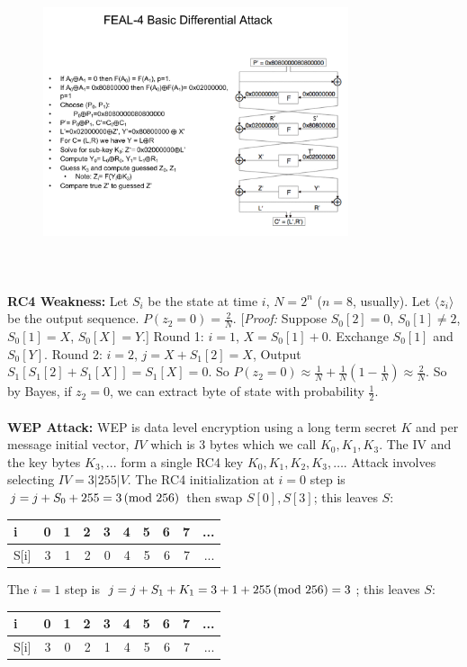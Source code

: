 \begin{figure} 
\center
\includegraphics[width=0.8\textwidth,natwidth=642,natheight=610, height=80mm, width=88mm]{feal2.pdf}
\end{figure}
\\
{\bf RC4 Weakness:}  Let $S_i$ be the state at time $i$, $N= 2^n$ ($n=8$,
usually).
Let $\langle z_i \rangle$ be the output sequence.  $P(z_2=0)= {\frac 2 N}$.
[\emph{Proof:} Suppose $S_0[2]=0$, $S_0[1] \ne 2$, $S_0[1]= X$, $S_0[X]= Y$.]
Round 1:
$i=1$, $X=S_0[1]+0$.  Exchange $S_0[1]$ and $S_0[Y]$.  Round 2: $i=2$,
$j= X+S_1[2]=X$,  Output $S_1[S_1[2]+S_1[X]]= S_1[X]= 0$.  So
$P(z_2 = 0) \approx {\frac 1 N} + {\frac 1 N} (1- {\frac 1 N}) \approx
{\frac 2 N}$.  So by Bayes, if $z_2= 0$, we can extract byte of state with
probability ${\frac 1 2}$.
\\
\\
{\bf WEP Attack:}
WEP is data level encryption using a long term secret $K$ and per message initial vector,
$IV$ which is $3$ bytes which we call $K_0, K_1, K_3$.  The IV and the key bytes $K_3, ...$
form a single RC4 key $K_0, K_1, K_2, K_3, \ldots$.  Attack involves selecting $IV= 3|255|V$.
The RC4 initialization at $i=0$ step is
$j= j+S_0+255 = 3 \thinspace \textnormal{(mod } 256 \textnormal{)}$ then swap $S[0], S[3]$; this leaves $S$:
\begin{center}
\begin{tabular} {|l|r|r|r|r|r|r|r|r|r|}
\hline
i & 0 & 1 & 2 & 3 & 4 & 5 & 6 & 7 & ... \\
\hline
S[i] & 3 & 1 & 2 & 0 & 4 & 5 & 6 & 7 & ... \\
\hline
\end{tabular}
\end{center}
The $i=1$ step is
$j= j+S_1+K_1 = 3+1+255 \thinspace \textnormal{(mod } 256 \textnormal{)}= 3$; this leaves $S$:
\begin{center}
\begin{tabular} {|l|r|r|r|r|r|r|r|r|r|}
\hline
i & 0 & 1 & 2 & 3 & 4 & 5 & 6 & 7 & ... \\
\hline
S[i] & 3 & 0 & 2 & 1 & 4 & 5 & 6 & 7 & ... \\
\hline
\end{tabular}
\end{center}
